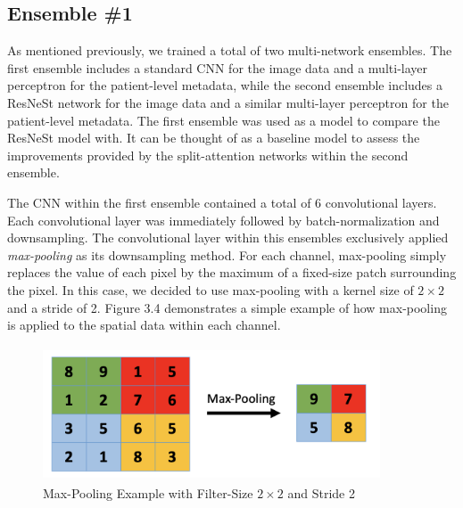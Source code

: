 \documentclass [MAS] {uclathes}
\begin{document}
\subsection{Ensemble \#1}

As mentioned previously, we trained a total of two multi-network ensembles. The first ensemble includes a standard CNN for the image data and a multi-layer perceptron for the patient-level metadata, while the second ensemble includes a ResNeSt network for the image data and a similar multi-layer perceptron for the patient-level metadata. The first ensemble was used as a model to compare the ResNeSt model with. It can be thought of as a baseline model to assess the improvements provided by the split-attention networks within the second ensemble. 

The CNN within the first ensemble contained a total of 6 convolutional layers. Each convolutional layer was immediately followed by batch-normalization and downsampling. The convolutional layer within this ensembles exclusively applied \textit{max-pooling} as its downsampling method. For each channel, max-pooling simply replaces the value of each pixel by the maximum of a fixed-size patch surrounding the pixel. In this case, we decided to use max-pooling with a kernel size of $2 \times 2$ and a stride of 2. Figure 3.4 demonstrates a simple example of how max-pooling is applied to the spatial data within each channel. 

\begin{figure}[h]
\centering
\includegraphics[height = 40mm, width= 100mm]{imgs/maxpool.png}
\caption{Max-Pooling Example with Filter-Size $2 \times 2$ and Stride 2}
\label{fig:maxpool}
\end{figure}
\end{document}
